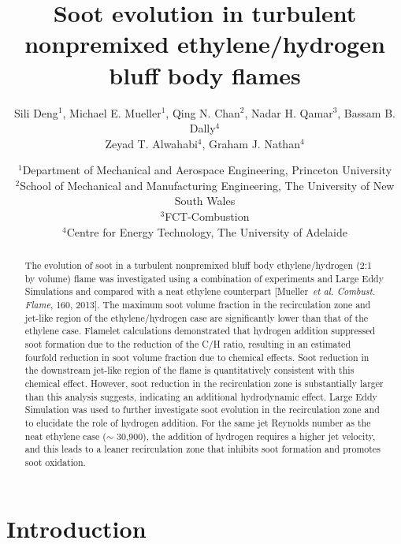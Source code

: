\documentclass{essci}
\begin{document}
\title{ Soot evolution in turbulent nonpremixed ethylene/hydrogen bluff body flames }
\author{
%
Sili Deng$^1$, Michael E. Mueller$^1$, Qing N. Chan$^2$, Nadar H. Qamar$^3$, Bassam B. Dally$^4$ \\
Zeyad T. Alwahabi$^4$, Graham J. Nathan$^4$
%
}
\date{
%
$^1$Department of Mechanical and Aerospace Engineering, Princeton University \\
$^2$School of Mechanical and Manufacturing Engineering, The University of New South Wales \\
$^3$FCT-Combustion \\
$^4$Centre for Energy Technology, The University of Adelaide
%
}
\maketitle

\begin{abstract}
The evolution of soot in a turbulent nonpremixed bluff body ethylene/hydrogen (2:1 by volume) flame was investigated using a combination of experiments and Large Eddy Simulations and compared with a neat ethylene counterpart [Mueller~\emph{et al. Combust. Flame}, 160, 2013].  The maximum soot volume fraction in the recirculation zone and jet-like region of the ethylene/hydrogen case are significantly lower than that of the ethylene case.  Flamelet calculations demonstrated that hydrogen addition suppressed soot formation due to the reduction of the C/H ratio, resulting in an estimated fourfold reduction in soot volume fraction due to chemical effects.  Soot reduction in the downstream jet-like region of the flame is quantitatively consistent with this chemical effect.  However, soot reduction in the recirculation zone is substantially larger than this analysis suggests, indicating an additional hydrodynamic effect.  Large Eddy Simulation was used to further investigate soot evolution in the recirculation zone and to elucidate the role of hydrogen addition.  For the same jet Reynolds number as the neat ethylene case ($\sim$ 30,900), the addition of hydrogen requires a higher jet velocity, and this leads to a leaner recirculation zone that inhibits soot formation and promotes soot oxidation.
\end{abstract}


\section{Introduction}
\end{document}
